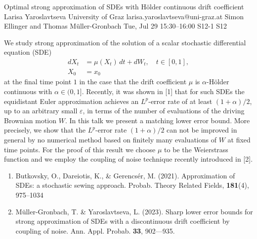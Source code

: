 \documentclass[12pt,lettersize,oneside]{book} %
\begin{document}
\begin{talk}
  {Optimal strong approximation of SDEs with H\"older continuous drift coefficient}%
  {Larisa Yaroslavtseva}%
  {University of Graz}%
  {larisa.yaroslavtseva@uni-graz.at}%
  {Simon Ellinger and Thomas M\"uller-Gronbach}%
  {}%
  {Tue, Jul 29 15:30--16:00}%
  {S12-1}%
  {S12}%
  
    
   
We study strong approximation of the solution of a scalar stochastic differential equation (SDE)
\begin{equation}\label{sde0}
 \begin{aligned}
  dX_t & = \mu(X_t) \, dt +  dW_t, \quad t\in [0,1],\\
  X_0 & = x_0
 \end{aligned}
\end{equation}
at the final time point $1$
in the case that  the drift coefficient  $\mu$ is $\alpha$-H\"older continuous with $\alpha\in(0, 1]$.
Recently, it was  shown in [1] that for such SDEs the equidistant Euler approximation achieves an $L^p$-error rate of at least $(1+\alpha)/2$, up to an arbitrary small $\varepsilon$,
in terms of the number of evaluations of the driving Brownian motion $W$.
In this talk  we  
present a matching  lower error bound.   More precisely, we show that
the $L^p$-error rate $(1+\alpha)/2$ can
not be improved in general by  no numerical 
method based on finitely many evaluations of $W$ at fixed time points. For the proof of this result we choose  $\mu$ to be the Weierstrass function and we employ  the coupling of noise technique  recently introduced in [2].




\begin{enumerate}
 \item[{[1]}] Butkovsky, O., Dareiotis, K., \& Gerencs\'er, M. (2021). Approximation of SDEs: a stochastic sewing approach. Probab. Theory Related Fields, \textbf{181}(4), 975--1034
 \item[{[2]}] M\"uller-Gronbach, T.  \& Yaroslavtseva, L. (2023). Sharp lower error bounds for strong approximation of
 SDEs with a discontinuous drift coefficient by coupling of noise. Ann. Appl. Probab. \textbf{33}, 902---935.
\end{enumerate}


\end{talk}
\end{document}
